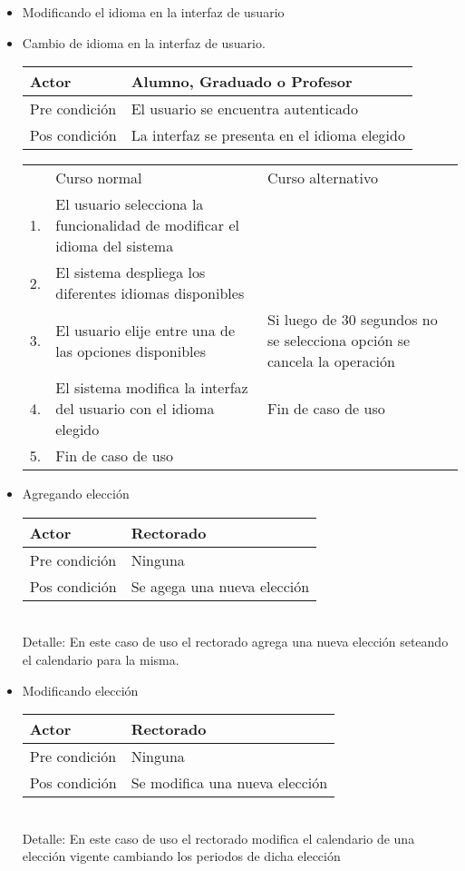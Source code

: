 \begin{itemize}
\bigskip
\item Modificando el idioma en la interfaz de usuario
\bigskip
\item Cambio de idioma en la interfaz de usuario.
\begin{center}
\begin{tabular}{ll}
Actor & Alumno, Graduado o Profesor \\
\hline
Pre condición & El usuario se encuentra autenticado \\
\hline
Pos condición & La interfaz se presenta en el idioma elegido \\
\hline
\end{tabular}
\medskip
\begin{tabular}{c p{4cm}|p{4cm}}
 & Curso normal & Curso alternativo \\
 1. & El usuario selecciona la funcionalidad de modificar el idioma del sistema &   \\
 2. & El sistema despliega los diferentes idiomas disponibles &   \\
 3. & El usuario elije entre una de las opciones disponibles & Si luego de 30 segundos no se selecciona opción se cancela la operación\\
 4. & El sistema modifica la interfaz del usuario con el idioma elegido & Fin de caso de uso\\
 5. & Fin de caso de uso & \\
\end{tabular}
\end{center}





\bigskip
\item Agregando elección
\begin{center}
\begin{tabular}{ll}
Actor & Rectorado \\
\hline
Pre condici\'on & Ninguna \\
\hline
Pos condici\'on & Se agega una nueva elección \\
\hline
\end{tabular}
\medskip
\\
Detalle: En este caso de uso el rectorado agrega una nueva elección seteando el calendario para la misma.
\end{center}


\bigskip
\item Modificando elección
\begin{center}
\begin{tabular}{ll}
Actor & Rectorado \\
\hline
Pre condici\'on & Ninguna \\
\hline
Pos condici\'on & Se modifica una nueva elección \\
\hline
\end{tabular}
\medskip
\\
Detalle: En este caso de uso el rectorado modifica el calendario de una elección vigente cambiando los periodos de dicha elección
\end{center}



\end{itemize}
